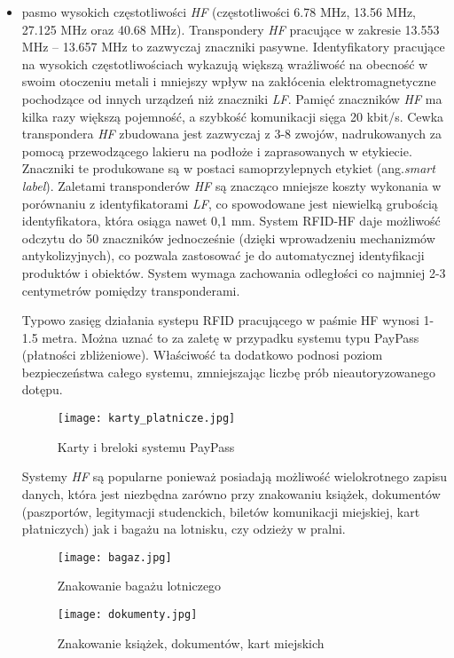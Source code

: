 \begin{itemize}
	\newpage


	\item pasmo wysokich częstotliwości \emph{HF} (częstotliwości 6.78 MHz, 13.56 MHz, 27.125 MHz oraz 40.68 MHz). 
Transpondery \emph{HF} pracujące w zakresie 13.553 MHz – 13.657 MHz to zazwyczaj znaczniki pasywne. Identyfikatory pracujące na wysokich częstotliwościach wykazują większą wrażliwość na obecność w swoim otoczeniu metali i mniejszy wpływ na zakłócenia elektromagnetyczne pochodzące od innych urządzeń niż znaczniki \emph{LF}. Pamięć znaczników \emph{HF} ma kilka razy większą pojemność, a szybkość komunikacji sięga 20 kbit/s. Cewka transpondera \emph{HF} zbudowana jest zazwyczaj z 3-8 zwojów, nadrukowanych za pomocą przewodzącego lakieru na podłoże i zaprasowanych w etykiecie. Znaczniki te produkowane są w postaci samoprzylepnych etykiet (ang.\emph{smart label}). Zaletami transponderów \emph{HF} są znacząco mniejsze koszty wykonania w porównaniu z identyfikatorami \emph{LF}, co spowodowane jest niewielką grubością identyfikatora, która osiąga nawet 0,1 mm. System RFID-HF daje możliwość odczytu do 50 znaczników jednocześnie (dzięki wprowadzeniu mechanizmów antykolizyjnych), co pozwala zastosować je do automatycznej identyfikacji produktów i obiektów. System wymaga zachowania odległości co najmniej 2-3 centymetrów pomiędzy transponderami. 
	
	Typowo zasięg działania systepu RFID pracującego w paśmie HF wynosi 1-1.5 metra. Można uznać to za zaletę w przypadku systemu typu PayPass (płatności zbliżeniowe). Właściwość ta dodatkowo podnosi poziom bezpieczeństwa całego systemu, zmniejszając liczbę prób nieautoryzowanego dotępu.  

	\begin{figure}[h!]
	\centering
	    \texttt{[image: karty\_platnicze.jpg]}
	    \caption{Karty i breloki systemu PayPass}
	\end{figure}

	Systemy \emph{HF} są popularne ponieważ posiadają możliwość wielokrotnego zapisu danych, która jest niezbędna zarówno przy znakowaniu książek, dokumentów (paszportów, legitymacji studenckich, biletów komunikacji miejskiej, kart płatniczych) jak i bagażu na lotnisku, czy odzieży w pralni.

	\begin{figure}[h!]
	\centering
	    \texttt{[image: bagaz.jpg]}
	    \caption{Znakowanie bagażu lotniczego}
	\end{figure}

	\begin{figure}[h!]
	\centering
	    \texttt{[image: dokumenty.jpg]}
	    \caption{Znakowanie książek, dokumentów, kart miejskich}
	\end{figure}
	

\end{itemize}
